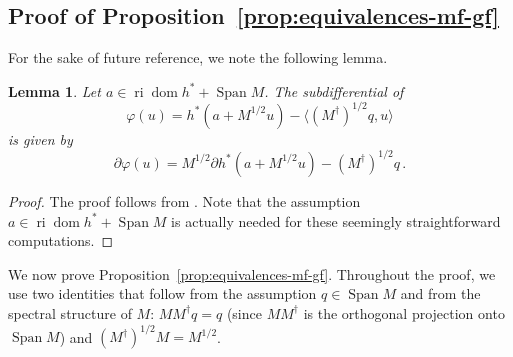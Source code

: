 \documentclass[11pt,english,reqno]{article}
\DeclareMathOperator{\Span}{Span}
\DeclareMathOperator{\dom}{dom}
\DeclareMathOperator{\ri}{ri}
\theoremstyle{plain}
\newtheorem{lem}[proposition]{Lemma}
\theoremstyle{definition}
\theoremstyle{remark}
\numberwithin{equation}{section}
\begin{document}
\subsection{Proof of Proposition~\ref{prop:equivalences-mf-gf}}
\label{sec:proof-equivalences-mf-gf}

For the sake of future reference, we note the following lemma.

\begin{lem}
	\label{lem:subdiff}
	Let $a \in \ri \dom h^* + \Span M$. The subdifferential of 
	\begin{equation*}
		\varphi(u) = h^*(a + M^{1/2} u) - \langle (M^\dagger)^{1/2} q , u \rangle
	\end{equation*}
	is given by 
	\begin{equation*}
		\partial \varphi(u) = M^{1/2} \partial h^*(a + M^{1/2} u) - (M^\dagger)^{1/2} q \, .
	\end{equation*}
\end{lem}

\begin{proof}
	The proof follows from \cite[Thm.~16.47]{bauschke2017convex}. Note that the assumption $a \in \ri \dom h^* + \Span M$ is actually needed for these seemingly straightforward computations. 
\end{proof}

\noindent
We now prove Proposition~\ref{prop:equivalences-mf-gf}. Throughout the proof, we use two identities that follow from the assumption $q \in \Span M$ and from the spectral structure of $M$: $MM^\dagger q = q$ (since $MM^\dagger$ is the orthogonal projection onto $\Span M$) and $(M^\dagger)^{1/2}M = M^{1/2}$.
\end{document}
